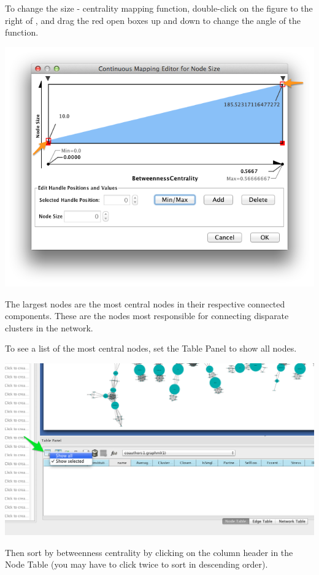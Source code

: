 \documentclass[letterpaper,10pt,english]{sphinxmanual}
\begin{document}
To change the size - centrality mapping function, double-click on the figure to the right
of , and drag the red open boxes up and down to change the angle of the
function.

{\hfill\includegraphics{coauthors.13.png}\hfill}

The largest nodes are the most central nodes in their respective connected components.
These are the nodes most responsible for connecting disparate clusters in the network.

To see a list of the most central nodes, set the Table Panel to show all nodes.

{\hfill\includegraphics{coauthors.14.png}\hfill}

Then sort by betweenness centrality by clicking on the column header in the Node Table
(you may have to click twice to sort in descending order).
\end{document}
